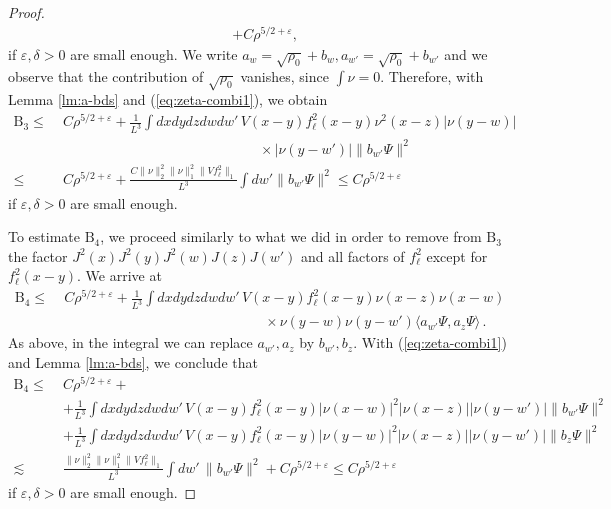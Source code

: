 \documentclass[10pt,a4paper]{amsart}
\def\eps{\varepsilon}
\begin{document}
\begin{proof}
\[\begin{split}
&+ C \rho^{5/2+\eps},
\end{split}  \]
if $\eps, \delta > 0$ are small enough. We write $a_w = \sqrt{\rho_0} + b_w, a_{w'} = \sqrt{\rho_0} + b_{w'}$ and we observe that the contribution of $\sqrt{\rho_0}$ vanishes, since $\int \nu = 0$. Therefore, with Lemma \ref{lm:a-bds} and (\ref{eq:zeta-combi1}), we obtain 
\[ \begin{split} \text{B}_3 \leq \; &C\rho^{5/2+\eps} + \frac{1}{L^3} \int  dx dy dz dw dw' \, V(x-y) f_\ell^2(x-y) \nu^2 (x-z) |\nu (y-w)| \\
&\qquad\qquad\qquad\qquad\qquad\qquad\qquad\times|\nu (y-w')| \| b_{w'} \Psi \|^2 \\
 \leq \; & C \rho^{5/2+\eps} + \frac{C \| \nu \|_2^2 \| \nu \|_1^2\|Vf_\ell^2\|_1}{L^3} \int dw' \| b_{w'} \Psi \|^2 \leq C  \rho^{5/2+\eps} \end{split}  \] 
if $\eps, \delta > 0$ are small enough. 

To estimate $\text{B}_4$, we proceed similarly to what we did in order to remove from $\text{B}_3$ the factor $J^2 (x) J^2 (y) J^2 (w) J(z) J(w')$ and all factors of $f_\ell^2$ except for $f_\ell^2(x-y)$. We arrive at 
\[  \begin{split} \text{B}_4 \leq \; &C \rho^{5/2+\eps} + \frac{1}{L^3} \int dx dy dz dw dw' \, V (x-y) f_\ell^2 (x-y)  \nu (x-z) \nu (x-w) \\ &\hspace{6cm} \times \nu (y-w) \nu (y-w') \langle a_{w'} \Psi , a_z \Psi \rangle \, . \end{split} \]
As above, in the integral we can replace $a_{w'}, a_z$ by $b_{w'}, b_z$. With (\ref{eq:zeta-combi1}) and Lemma \ref{lm:a-bds}, we conclude that 
\[ \begin{split} \text{B}_4 \leq \; &C \rho^{5/2+\eps}+\\
&+\frac{1}{L^3} \int dx dy dz dw dw' \, V(x-y)f_\ell^2(x-y) |\nu (x-w)|^2 |\nu (x-z)| |\nu (y-w')| \| b_{w'} \Psi \|^2 \\ &+ \frac{1}{L^3}  \int dx dy dz dw dw' \, V(x-y)f_\ell^2(x-y) |\nu (y-w)|^2 |\nu (x-z)| |\nu (y-w')| \| b_{z} \Psi \|^2  \\ \lesssim \; &\frac{\| \nu \|_2^2 \| \nu \|_1^2 \|Vf_\ell^2\|_1}{L^3}  \int dw' \, \| b_{w'} \Psi \|^2 + C \rho^{5/2 + \eps} \leq C \rho^{5/2+\eps} \end{split} \]
if $\eps, \delta > 0$ are small enough. 


\end{proof}
\end{document}
